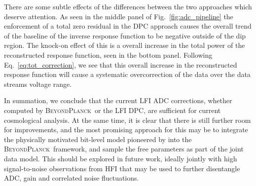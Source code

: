 \documentclass[twocolumn]{aa}
\newcommand{\BP}{\textsc{BeyondPlanck}}
\begin{document}
There are some subtle effects of the differences between the two approaches which deserve attention. As seen in the middle panel of Fig.~\ref{fig:adc_pipeline} the enforcement of a total zero residual in the DPC approach causes the overall trend of the baseline of the inverse response function to be negative outside of the dip region. The knock-on effect of this is a overall increase in the total power of the reconstructed response function, seen in the bottom panel. Following Eq.~\ref{eq:tot_correction}, we see that this overall increase in the reconstructed response function will cause a systematic overcorrection of the data over the data streams voltage range.

In summation, we conclude that the current LFI ADC corrections, whether computed by \BP\ or the LFI DPC, are sufficient for current cosmological analysis. At the same time, it is clear that there is still further room for improvements, and the most promising approach for this may be to integrate the physically motivated bit-level model pioneered by \citet{planck2016-l02} into the \BP\ framework, and sample the free parameters as part of the joint data model. This should be explored in future work, ideally jointly with high signal-to-noise observations from HFI that may be used to further disentangle ADC, gain and correlated noise fluctuations.






\end{document}
